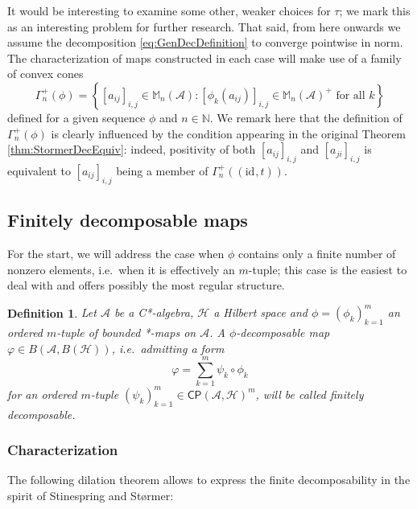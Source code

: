 \documentclass[reqno]{amsart}
\theoremstyle{plain}
\newtheorem{definition}{Definition}
\numberwithin{equation}{section}
\numberwithin{theorem}{section}
\numberwithin{lemma}{section}
\numberwithin{definition}{section}
\numberwithin{corollary}{section}
\numberwithin{remark}{section}
\newcommand{\naturals}{\mathbb{N}}
\newcommand{\id}[1]{\mathrm{id}_{#1}}
\newcommand{\hilbert}{\mathcal{H}}
\newcommand{\matra}[2]{\mathbb{M}_{#1}(#2)}
\newcommand{\cp}[2]{\mathsf{CP}(#1,#2)}
\newcommand{\transpose}{t}
\begin{document}
 It would be interesting to examine some other, weaker choices for $\tau$; we mark this as an interesting problem for further research. That said, from here onwards we assume the decomposition \eqref{eq:GenDecDefinition} to converge pointwise in norm. The characterization of maps constructed in each case will make use of a family of convex cones
\begin{equation}\label{eq:GammaCones}
    \Gamma_{n}^{+} (\phi) = \left\{ \left[a_{ij}\right]_{i,j} \in \matra{n}{\mathscr{A}} : \left[\phi_k (a_{ij})\right]_{i,j} \in \matra{n}{\mathscr{A}}^+  \text{ for all } k\right\}
\end{equation}
defined for a given sequence $\phi$ and $n\in\naturals$. We remark here that the definition of $\Gamma_{n}^{+} (\phi)$ is clearly influenced by the condition appearing in the original Theorem \ref{thm:StormerDecEquiv}: indeed, positivity of both $\left[a_{ij}\right]_{i,j}$ and $\left[a_{ji}\right]_{i,j}$ is equivalent to $\left[a_{ij}\right]_{i,j}$ being a member of $\Gamma_{n}^{+} ((\id{},\transpose))$.

\subsection{Finitely decomposable maps}

For the start, we will address the case when $\phi$ contains only a finite number of nonzero elements, i.e.~when it is effectively an $m$-tuple; this case is the easiest to deal with and offers possibly the most regular structure.

\begin{definition}\label{def:FDM}
    Let $\mathscr{A}$ be a C*-algebra, $\hilbert$ a Hilbert space and $\phi = (\phi_k)_{k=1}^{m}$ an ordered $m$-tuple of bounded *-maps on $\mathscr{A}$. A $\phi$-decomposable map $\varphi \in B(\mathscr{A},B(\hilbert))$, i.e.~admitting a form
    \begin{equation}\label{eq:FinDecDefinition}
        \varphi = \sum_{k=1}^{m} \psi_k \circ \phi_k
    \end{equation}
    for an ordered $m$-tuple $(\psi_k)_{k=1}^{m} \in \cp{\mathscr{A}}{\hilbert}^m$, will be called finitely decomposable.
\end{definition}

\subsubsection{Characterization}

The following dilation theorem allows to express the finite decomposability in the spirit of Stinespring and Størmer:
\end{document}

